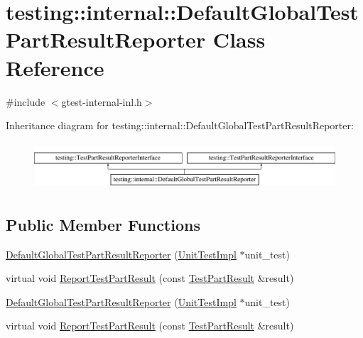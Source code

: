 \hypertarget{classtesting_1_1internal_1_1_default_global_test_part_result_reporter}{\section{testing\-:\-:internal\-:\-:Default\-Global\-Test\-Part\-Result\-Reporter Class Reference}
\label{classtesting_1_1internal_1_1_default_global_test_part_result_reporter}
}


{\ttfamily \#include $<$gtest-\/internal-\/inl.\-h$>$}

Inheritance diagram for testing\-:\-:internal\-:\-:Default\-Global\-Test\-Part\-Result\-Reporter\-:\begin{figure}[H]
\begin{center}
\leavevmode
\includegraphics[height=1.777778cm]{classtesting_1_1internal_1_1_default_global_test_part_result_reporter}
\end{center}
\end{figure}
\subsection*{Public Member Functions}
\begin{DoxyCompactItemize}
\item 
\hyperlink{classtesting_1_1internal_1_1_default_global_test_part_result_reporter_a3900ea7f34b34afd48c7d1d0312a1488}{Default\-Global\-Test\-Part\-Result\-Reporter} (\hyperlink{classtesting_1_1internal_1_1_unit_test_impl}{Unit\-Test\-Impl} $\ast$unit\-\_\-test)
\item 
virtual void \hyperlink{classtesting_1_1internal_1_1_default_global_test_part_result_reporter_a6081576a23b964cfecab1e424d8044fc}{Report\-Test\-Part\-Result} (const \hyperlink{classtesting_1_1_test_part_result}{Test\-Part\-Result} \&result)
\item 
\hyperlink{classtesting_1_1internal_1_1_default_global_test_part_result_reporter_a3900ea7f34b34afd48c7d1d0312a1488}{Default\-Global\-Test\-Part\-Result\-Reporter} (\hyperlink{classtesting_1_1internal_1_1_unit_test_impl}{Unit\-Test\-Impl} $\ast$unit\-\_\-test)
\item 
virtual void \hyperlink{classtesting_1_1internal_1_1_default_global_test_part_result_reporter_a92cd8be4f8932fcc26006ee4a6cf8556}{Report\-Test\-Part\-Result} (const \hyperlink{classtesting_1_1_test_part_result}{Test\-Part\-Result} \&result)
\end{DoxyCompactItemize}


